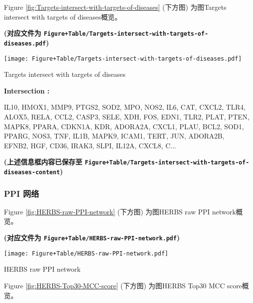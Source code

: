 \documentclass[
]{article}
\begin{document}
Figure \ref{fig:Targets-intersect-with-targets-of-diseases} (下方图) 为图Targets intersect with targets of diseases概览。

\textbf{(对应文件为 \texttt{Figure+Table/Targets-intersect-with-targets-of-diseases.pdf})}

\def\@captype{figure}
\begin{center}
\texttt{[image: Figure+Table/Targets-intersect-with-targets-of-diseases.pdf]}
\caption{Targets intersect with targets of diseases}\label{fig:Targets-intersect-with-targets-of-diseases}
\end{center}
\begin{center}\begin{tcolorbox}[colback=gray!10, colframe=gray!50, width=0.9\linewidth, arc=1mm, boxrule=0.5pt]
\textbf{
Intersection
:}

\vspace{0.5em}

    IL10, HMOX1, MMP9, PTGS2, SOD2, MPO, NOS2, IL6, CAT,
CXCL2, TLR4, ALOX5, RELA, CCL2, CASP3, SELE, XDH, FOS,
EDN1, TLR2, PLAT, PTEN, MAPK8, PPARA, CDKN1A, KDR, ADORA2A,
CXCL1, PLAU, BCL2, SOD1, PPARG, NOS3, TNF, IL1B, MAPK9,
ICAM1, TERT, JUN, ADORA2B, EFNB2, HGF, CD36, IRAK3, SLPI,
IL12A, CXCL8, C...

\vspace{2em}
\end{tcolorbox}
\end{center}

\textbf{(上述信息框内容已保存至 \texttt{Figure+Table/Targets-intersect-with-targets-of-diseases-content})}

\hypertarget{ppi-ux7f51ux7edc}{%
\subsubsection{PPI 网络}\label{ppi-ux7f51ux7edc}}

Figure \ref{fig:HERBS-raw-PPI-network} (下方图) 为图HERBS raw PPI network概览。

\textbf{(对应文件为 \texttt{Figure+Table/HERBS-raw-PPI-network.pdf})}

\def\@captype{figure}
\begin{center}
\texttt{[image: Figure+Table/HERBS-raw-PPI-network.pdf]}
\caption{HERBS raw PPI network}\label{fig:HERBS-raw-PPI-network}
\end{center}

Figure \ref{fig:HERBS-Top30-MCC-score} (下方图) 为图HERBS Top30 MCC score概览。
\end{document}
